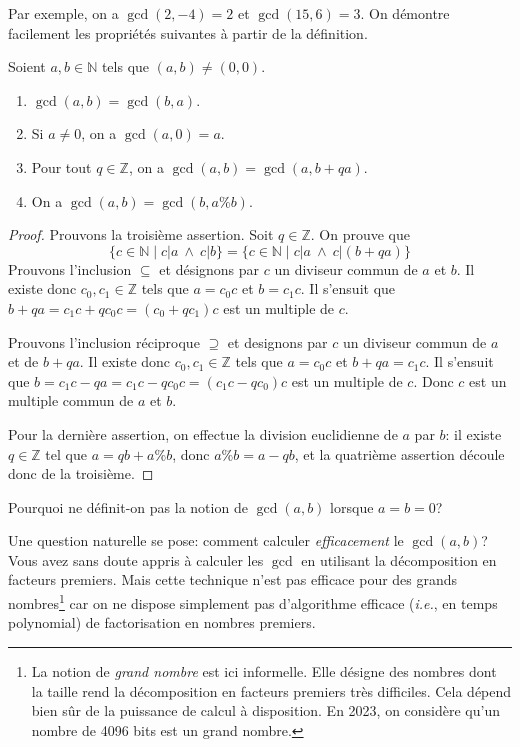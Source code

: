 \documentclass[french,course,oneside,theoremnosection]{lecture}
\newcommand{\N}{\mathbb{N}}
\newcommand{\Z}{\mathbb{Z}}
\begin{document}
Par exemple, on a $\gcd(2,-4)=2$ et $\gcd(15,6)=3$. On démontre facilement les propriétés suivantes à partir de la définition.
\begin{proposition}\label{prop:gcd} Soient $a,b \in \N$ tels que $(a,b)\neq (0,0)$.
\begin{enumerate}
\item $\gcd(a,b)=\gcd(b,a)$.
\item Si $a\neq 0$, on a $\gcd(a,0)=a$.
\item Pour tout $q\in \Z$, on a $\gcd(a,b)=\gcd(a,b+qa)$.
\item On a $\gcd(a,b)=\gcd(b,a\%b)$.
\end{enumerate}
\end{proposition}
\begin{proof}
Prouvons la troisième assertion. Soit $q\in \Z$. On prouve que 
\[
\{c \in \N \mid c | a \ \wedge\ c | b\} = \{c \in \N \mid c |a\ \wedge\ c | (b+qa)\}
\]
Prouvons l'inclusion $\subseteq$ et désignons par $c$ un diviseur commun de $a$ et $b$. Il existe donc $c_0, c_1\in \Z$ tels que $a=c_0c$ et $b=c_1c$. Il s'ensuit que $b+qa=c_1c+qc_0c=(c_0+qc_1) c$ est un multiple de $c$.

Prouvons l'inclusion réciproque $\supseteq$ et designons par $c$ un diviseur commun de $a$ et de $b+qa$. Il existe donc $c_0, c_1\in \Z$ tels que $a=c_0c$ et $b+qa=c_1c$. Il s'ensuit que $b=c_1c-qa=c_1c-qc_0c=(c_1c-qc_0)c$ est un multiple de $c$. Donc $c$ est un multiple commun de $a$ et $b$.

Pour la dernière assertion, on effectue la division euclidienne de $a$ par $b$: il existe $q\in \Z$ tel que $a=qb+a\%b$, donc $a\%b=a-qb$, et la quatrième assertion découle donc de la troisième.
\end{proof}
\begin{remark}
Pourquoi ne définit-on pas la notion de $\gcd(a,b)$ lorsque $a=b=0$?
\end{remark}


Une question naturelle se pose: comment calculer \emph{efficacement} le $\gcd(a,b)$? Vous avez sans doute appris à calculer les $\gcd$ en utilisant la décomposition en facteurs premiers. Mais cette technique n'est pas efficace pour des grands nombres\footnote{La notion de \emph{grand nombre} est ici informelle. Elle désigne des nombres dont la taille rend la décomposition en facteurs premiers très difficiles. Cela dépend bien sûr de la puissance de calcul à disposition. En 2023, on considère qu'un nombre de 4096 bits est un grand nombre.} car on ne dispose simplement pas d'algorithme efficace (\emph{i.e.}, en temps polynomial) de factorisation en nombres premiers.
\end{document}

